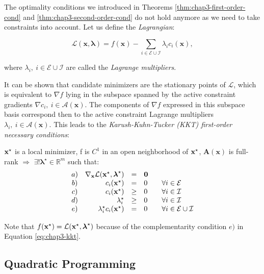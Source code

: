 The optimality conditions we introduced in Theorems
\ref{thm:chap3-first-order-cond} and \ref{thm:chap3-second-order-cond}
do not hold anymore as we need to take constraints into account. Let
us define the \emph{Lagrangian}:

\begin{equation}
\mathcal{L}(\mathbf{x},\boldsymbol{\lambda}) =
f(\mathbf{x})-\sum_{i\in\mathcal{E}\cup\mathcal{I}}
\lambda_ic_i(\mathbf{x}),
\end{equation}

where $\lambda_i,~i\in \mathcal{E}\cup\mathcal{I}$ are called the
\emph{Lagrange multipliers}.

It can be shown that candidate minimizers are the stationary points of
$\mathcal{L}$, which is equivalent to $\nabla f$ lying in the subspace
spanned by the active constraint gradients $\nabla
c_i,~i\in\mathcal{A(\mathbf{x})}$. The components of $\nabla f$
expressed in this subspace basis correspond then to the active
constraint Lagrange multipliers
$\lambda_i,~i\in\mathcal{A}(\mathbf{x})$. This leads to the
\emph{Karush-Kuhn-Tucker (KKT) first-order necessary conditions}:

\begin{theorem}
\label{eq:chap3-kkt}
$\mathbf{x}^{\star}$ is a local minimizer, f is $C^1$ in an open neighborhood
of $\mathbf{x}^{\star}$, $\mathbf{A}(\mathbf{x})$ is full-rank $\Rightarrow$
$\exists! \boldsymbol{\lambda}^{\star} \in \mathbb R^m$ such that:
\[
\begin{array}{crcl}
a) & \nabla_{\mathbf{x}}\mathcal{L}(\argmin{x}, \boldsymbol{\lambda}^\star) & = & \mathbf{0} \\%
b) & c_i(\argmin{x}) & = & 0 \qquad \forall i \in \mathcal{E} \\%
c) & c_i(\argmin{x}) & \ge & 0 \qquad \forall i \in \mathcal{I}\\%
d) & \lambda_i^{\star} & \ge & 0 \qquad \forall i \in \mathcal{I}\\%
e) & \lambda_i^{\star} c_i(\argmin{x}) & = & 0 \qquad \forall i \in \mathcal{E}\cup\mathcal{I}%
\end{array}
\]
\end{theorem}

Note that $f(\mathbf{x}^{\star}) = \mathcal{L}(\mathbf{x}^{\star},
\boldsymbol{\lambda}^\star)$ because of the complementarity condition
$e)$ in Equation \ref{eq:chap3-kkt}.

\subsection{Quadratic Programming}

